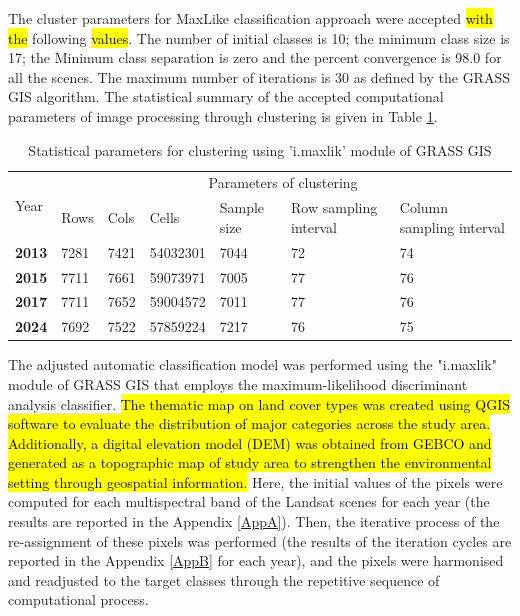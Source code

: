 \documentclass[jmse,article,submit,pdftex,moreauthors]{Definitions/mdpi}
\begin{document}
The cluster parameters for MaxLike classification approach were accepted \hl{with the }following \hl{values}. The number of initial classes is 10; the minimum class size is 17; the Minimum class separation is zero and the percent convergence is 98.0 for all the scenes. The maximum number of iterations is 30 as defined by the GRASS GIS algorithm. The statistical summary of the accepted computational parameters of image processing through clustering is given in Table \ref{tab02}.

\begin{table}[H]
  \centering
  \begin{tabularx}{\textwidth}{p{0.9cm}p{0.9cm}p{0.9cm}p{1.0cm}p{2.0cm}p{2.2cm}p{2.5cm}}
  \toprule
  \multirow{2}{*}{Year} & \multicolumn{6}{c}{Parameters of clustering} \\
     & Rows & Cols & Cells & Sample size & Row sampling interval & Column sampling interval \\
    \midrule
    \textbf{2013} & 7281 & 7421 & 54032301 & 7044 & 72 & 74 \\
    \textbf{2015} & 7711 & 7661 & 59073971 & 7005 & 77 & 76 \\
    \textbf{2017} & 7711 & 7652 & 59004572 & 7011 & 77 & 76 \\
    \textbf{2024} & 7692 & 7522 & 57859224 & 7217 & 76 & 75 \\
\bottomrule
\end{tabularx}
  \caption{Statistical parameters for clustering using 'i.maxlik' module of GRASS GIS}
  \label{tab02}
\end{table}

The adjusted automatic classification model was performed using the "i.maxlik" module of GRASS GIS that employs the maximum-likelihood discriminant analysis classifier. \hl{The thematic map on land cover types was created using QGIS software to evaluate the distribution of major categories across the study area. Additionally, a digital elevation model (DEM) was obtained from GEBCO and generated as a topographic map of study area to strengthen the environmental setting through geospatial information. }Here, the initial values of the pixels were computed for each multispectral band of the Landsat scenes for each year (the results are reported in the Appendix \ref{AppA}). Then, the iterative process of the re-assignment of these pixels was performed (the results of the iteration cycles are reported in the Appendix \ref{AppB} for each year), and the pixels were harmonised and readjusted to the target classes through the repetitive sequence of computational process. 
\end{document}
